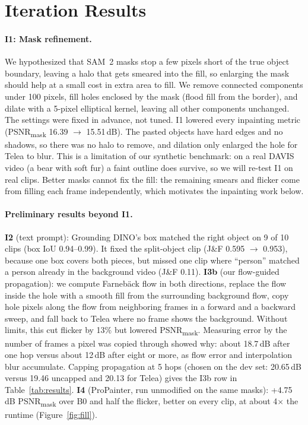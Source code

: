 \documentclass[11pt]{article}
\begin{document}
\section{Iteration Results}
\paragraph{I1: Mask refinement.} We hypothesized that SAM~2 masks stop a few pixels short of the true object boundary, leaving a halo that gets smeared into the fill, so enlarging the mask should help at a small cost in extra area to fill. We remove connected components under 100 pixels, fill holes enclosed by the mask (flood fill from the border), and dilate with a 5-pixel elliptical kernel, leaving all other components unchanged. The settings were fixed in advance, not tuned. I1 lowered every inpainting metric (PSNR\textsubscript{mask} 16.39 $\to$ 15.51\,dB). The pasted objects have hard edges and no shadows, so there was no halo to remove, and dilation only enlarged the hole for Telea to blur. This is a limitation of our synthetic benchmark: on a real DAVIS video (a bear with soft fur) a faint outline does survive, so we will re-test I1 on real clips. Better masks cannot fix the fill: the remaining smears and flicker come from filling each frame independently, which motivates the inpainting work below.

\paragraph{Preliminary results beyond I1.} \textbf{I2} (text prompt): Grounding DINO's box matched the right object on 9 of 10 clips (box IoU 0.94--0.99). It fixed the split-object clip (J\&F 0.595 $\to$ 0.953), because one box covers both pieces, but missed one clip where ``person'' matched a person already in the background video (J\&F 0.11). \textbf{I3b} (our flow-guided propagation): we compute Farneb\"ack flow in both directions, replace the flow inside the hole with a smooth fill from the surrounding background flow, copy hole pixels along the flow from neighboring frames in a forward and a backward sweep, and fall back to Telea where no frame shows the background. Without limits, this cut flicker by 13\% but lowered PSNR\textsubscript{mask}. Measuring error by the number of frames a pixel was copied through showed why: about 18.7\,dB after one hop versus about 12\,dB after eight or more, as flow error and interpolation blur accumulate. Capping propagation at 5 hops (chosen on the dev set: 20.65\,dB versus 19.46 uncapped and 20.13 for Telea) gives the I3b row in Table~\ref{tab:results}. \textbf{I4} (ProPainter, run unmodified on the same masks): +4.75\,dB PSNR\textsubscript{mask} over B0 and half the flicker, better on every clip, at about 4$\times$ the runtime (Figure~\ref{fig:fill}).
\end{document}
